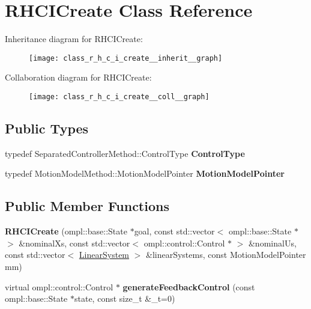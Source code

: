 \hypertarget{class_r_h_c_i_create}{\section{\-R\-H\-C\-I\-Create \-Class \-Reference}
\label{class_r_h_c_i_create}
}


\-Inheritance diagram for \-R\-H\-C\-I\-Create\-:
\nopagebreak
\begin{figure}[H]
\begin{center}
\leavevmode
\texttt{[image: class\_r\_h\_c\_i\_create\_\_inherit\_\_graph]}
\end{center}
\end{figure}


\-Collaboration diagram for \-R\-H\-C\-I\-Create\-:
\nopagebreak
\begin{figure}[H]
\begin{center}
\leavevmode
\texttt{[image: class\_r\_h\_c\_i\_create\_\_coll\_\_graph]}
\end{center}
\end{figure}
\subsection*{\-Public \-Types}
\begin{DoxyCompactItemize}
\item 
\hypertarget{class_r_h_c_i_create_a11c369848f9c90605af210dcbcfb0194}{typedef \*
\-Separated\-Controller\-Method\-::\-Control\-Type {\bfseries \-Control\-Type}}\label{class_r_h_c_i_create_a11c369848f9c90605af210dcbcfb0194}

\item 
\hypertarget{class_r_h_c_i_create_a662339ec07c14710db2903785224c183}{typedef \*
\-Motion\-Model\-Method\-::\-Motion\-Model\-Pointer {\bfseries \-Motion\-Model\-Pointer}}\label{class_r_h_c_i_create_a662339ec07c14710db2903785224c183}

\end{DoxyCompactItemize}
\subsection*{\-Public \-Member \-Functions}
\begin{DoxyCompactItemize}
\item 
\hypertarget{class_r_h_c_i_create_ae7a6a7c12aadfa3787c331658d257860}{{\bfseries \-R\-H\-C\-I\-Create} (ompl\-::base\-::\-State $\ast$goal, const std\-::vector$<$ ompl\-::base\-::\-State $\ast$ $>$ \&nominal\-Xs, const std\-::vector$<$ ompl\-::control\-::\-Control $\ast$ $>$ \&nominal\-Us, const std\-::vector$<$ \hyperlink{class_linear_system}{\-Linear\-System} $>$ \&linear\-Systems, const \-Motion\-Model\-Pointer mm)}\label{class_r_h_c_i_create_ae7a6a7c12aadfa3787c331658d257860}

\item 
\hypertarget{class_r_h_c_i_create_a098e194144edb28b252e97d78200f078}{virtual ompl\-::control\-::\-Control $\ast$ {\bfseries generate\-Feedback\-Control} (const ompl\-::base\-::\-State $\ast$state, const size\-\_\-t \&\-\_\-t=0)}\label{class_r_h_c_i_create_a098e194144edb28b252e97d78200f078}

\end{DoxyCompactItemize}
